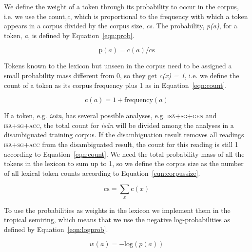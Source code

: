 \documentclass[11pt]{article}
\begin{document}
We define the weight of a token through its probability to occur in
the corpus, i.e. we use the count,\emph{c}, which is proportional to
the frequency with which a token appears in a corpus divided by the
corpus size, \emph{cs}. The probability, \emph{p(a)}, for a token,
\emph{a}, is defined by Equation~\ref{eqn:prob}.

\begin{small}
  \begin{equation}
    \label{eqn:prob}
    \mathrm{p}(a) = \mathrm{c}(a)/\mathrm{cs}
  \end{equation}
\end{small}

Tokens known to the lexicon but unseen in the corpus need to be
assigned a small probability mass different from 0, so they get
\emph{c(x) = 1}, i.e. we define the count of a token as its corpus
frequency plus 1 as in Equation~\ref{eqn:count}.

\begin{small}
  \begin{equation}
    \label{eqn:count}
    \mathrm{c}(a) = 1 + \mathrm{frequency}(a)
  \end{equation}
\end{small}

If a token, e.g. \emph{isän}, has several possible analyses, e.g.
\textsc{isä+sg+gen} and \textsc{isä+sg+acc}, the total count for
\emph{isän} will be divided among the analyses in a disambiguated
training corpus. If the disambiguation result removes all readings
\textsc{isä+sg+acc} from the disambiguated result, the count for this
reading is still 1 according to Equation~\ref{eqn:count}. We need the
total probability mass of all the tokens in the lexicon to sum up to
1, so we define the corpus size as the number of all lexical token
counts according to Equation~\ref{eqn:corpussize}.

\begin{small}
  \begin{equation}
    \label{eqn:corpussize}
    \mathrm{cs} = \sum_{x} \mathrm{c}(x)
  \end{equation}
\end{small}

To use the probabilities as weights in the lexicon we implement them in
the tropical semiring, which means that we use the negative
log-probabilities as defined by Equation~\ref{eqn:logprob}.

\begin{small}
  \begin{equation}
    \label{eqn:logprob}
    w(a) = -\mathrm{log}(p(a))
  \end{equation}
\end{small}
\end{document}
